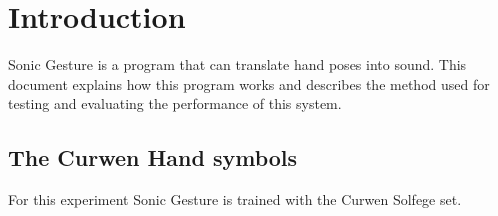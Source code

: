 \chapter{Introduction}
\label{ch:intro}

Sonic Gesture is a program that can translate hand poses into sound. This
document explains how this program works and describes the method used for
testing and evaluating the performance of this system.

\section{The Curwen Hand symbols}
For this experiment Sonic Gesture is trained with the Curwen Solfege set\cite{choksy1999}.

